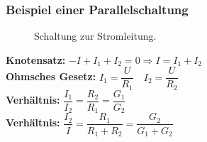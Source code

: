\subsubsection{Beispiel einer Parallelschaltung}
\begin{figure}[H]
\centering
\caption{Schaltung zur Stromleitung.}
\label{fig_IIIr}
\end{figure}
\textbf{Knotensatz:} $-I+I_1+I_2=0\Longrightarrow I=I_1+I_2$\\
\textbf{Ohmsches Gesetz:} $I_1=\dfrac{U}{R_1}\quad I_2=\dfrac{U}{R_2}$\\
\textbf{Verhältnis:} $\dfrac{I_1}{I_2}=\dfrac{R_2}{R_1}=\dfrac{G_1}{G_2}$\\
\textbf{Verhältnis:} $\dfrac{I_2}{I}=\dfrac{R_1}{R_1+R_2}=\dfrac{G_2}{G_1+G_2}$
